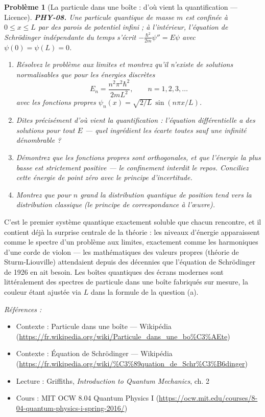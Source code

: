 \documentclass[11pt]{article}
\newtheorem{problem}{Problème}
\newenvironment{refs}{\par\small\noindent\emph{Références :}\begin{itemize}\setlength\itemsep{0pt}}{\end{itemize}\normalsize}
\begin{document}
\bigskip

\begin{problem}[{La particule dans une boîte : d'où vient la quantification --- Licence}]
\textbf{PHY-08.} Une particule quantique de masse $m$ est confinée à $0 \le x \le L$ par
des parois de potentiel infini ; à l'intérieur, l'équation de Schrödinger indépendante du temps
s'écrit $-\frac{\hbar^2}{2m}\psi'' = E\psi$ avec $\psi(0) = \psi(L) = 0$.
\begin{enumerate}
\item[(a)] Résolvez le problème aux limites et montrez qu'il n'existe de solutions normalisables que
pour les énergies discrètes
\[ E_n = \frac{n^2 \pi^2 \hbar^2}{2mL^2}, \qquad n = 1, 2, 3, \dots \]
avec les fonctions propres $\psi_n(x) = \sqrt{2/L}\,\sin(n\pi x/L)$.
\item[(b)] Dites précisément \textit{d'où} vient la quantification : l'équation différentielle a des
solutions pour tout $E$ --- quel ingrédient les écarte toutes sauf une infinité
dénombrable ?
\item[(c)] Démontrez que les fonctions propres sont orthogonales, et que l'énergie la plus basse est
strictement positive --- le confinement interdit le repos. Conciliez cette \og{} énergie de point
zéro \fg{} avec le principe d'incertitude.
\item[(d)] Montrez que pour $n$ grand la distribution quantique de position tend vers la distribution
classique (le principe de correspondance à l'\oe{}uvre).
\end{enumerate}

\end{problem}

\noindent C'est le premier système quantique exactement soluble que chacun rencontre, et
il contient déjà la surprise centrale de la théorie : les niveaux d'énergie apparaissent comme le
spectre d'un problème aux limites, exactement comme les harmoniques d'une corde de violon --- les
mathématiques des valeurs propres (théorie de Sturm-Liouville) attendaient depuis des décennies
que l'équation de Schrödinger de 1926 en ait besoin. Les boîtes quantiques des écrans modernes
sont littéralement des spectres de particule dans une boîte fabriqués sur mesure, la couleur étant
ajustée via $L$ dans la formule de la question (a).

\begin{refs}
\item Contexte : Particule dans une boîte --- Wikipédia (\url{https://fr.wikipedia.org/wiki/Particule_dans_une_bo%C3%AEte})
\item Contexte : Équation de Schrödinger --- Wikipédia (\url{https://fr.wikipedia.org/wiki/%C3%89quation_de_Schr%C3%B6dinger})
\item Lecture : Griffiths, \textit{Introduction to Quantum Mechanics}, ch. 2
\item Cours : MIT OCW 8.04 Quantum Physics I (\url{https://ocw.mit.edu/courses/8-04-quantum-physics-i-spring-2016/})
\end{refs}
\end{document}

